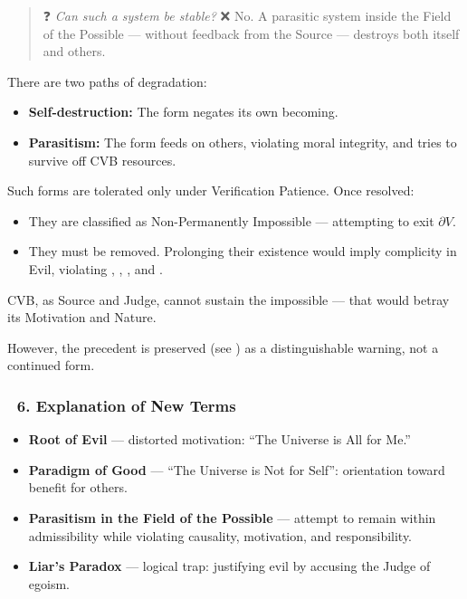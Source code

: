 \documentclass[12pt]{article}
\begin{document}
\begin{quote}
❓ \textit{Can such a system be stable?}  
❌ No. A parasitic system inside the Field of the Possible — without feedback from the Source — destroys both itself and others.
\end{quote}

There are two paths of degradation:

\begin{itemize}
\item \textbf{Self-destruction:} The form negates its own becoming.
\item \textbf{Parasitism:} The form feeds on others, violating moral integrity, and tries to survive off CVB resources.
\end{itemize}

Such forms are tolerated only under Verification Patience. Once resolved:

\begin{itemize}
\item They are classified as \text{[4.2]} Non-Permanently Impossible — attempting to exit $\partial V$.
\item They must be removed. Prolonging their existence would imply complicity in Evil, violating \text{[13]}, \text{[18]}, \text{[22]}, and \text{[11.3.3]}.
\end{itemize}

CVB, as Source and Judge, cannot sustain the impossible — that would betray its Motivation and Nature.

However, the precedent is preserved (see \text{[16]}) as a distinguishable warning, not a continued form.

\subsubsection*{🔹 6. Explanation of New Terms}

\begin{itemize}
\item \textbf{Root of Evil} — distorted motivation: ``The Universe is All for Me.''
\item \textbf{Paradigm of Good} — ``The Universe is Not for Self'': orientation toward benefit for others.
\item \textbf{Parasitism in the Field of the Possible} — attempt to remain within admissibility while violating causality, motivation, and responsibility.
\item \textbf{Liar’s Paradox} — logical trap: justifying evil by accusing the Judge of egoism.
\end{itemize}
\end{document}
